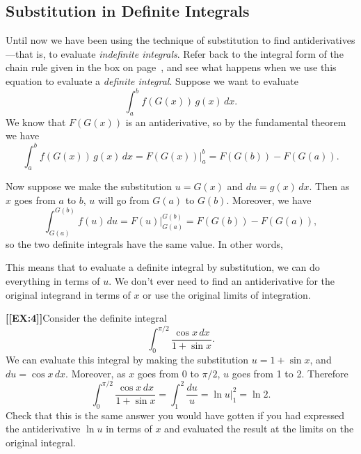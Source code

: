 \subsection{Substitution in Definite Integrals}
\label{subsec:substitution-in-definite-integrals}

Until now we have been using the technique of substitution to find
antiderivatives---that is, to evaluate {\em indefinite integrals}.
Refer back to the integral form of the chain rule given in the box on
page~\pageref{subrule}, and see what happens when we use this equation
to evaluate a {\em definite integral}.  Suppose we want to evaluate
\[
\int_a^bf(G(x))\,g(x)\,dx.
\] 
We know that $F(G(x))$ is an antiderivative, so by the fundamental
theorem we have
\[
\int_a^bf(G(x))\,g(x)\,dx=\left. F(G(x))\right|_a^b=F(G(b))-F(G(a)).
\]

Now suppose we make the substitution $u=G(x)$ and $du=g(x)\,dx$.  Then
as $x$ goes from $a$ to $b$, $u$ will go from $G(a)$ to $G(b)$.
Moreover, we have
\[
\int_{G(a)}^{G(b)} f(u)\,du=\left. F(u)\right|_{G(a)}^{G(b)} = F(G(b))-F(G(a)),
\]
so the two definite integrals have the same value. In other words,
\label{defint}
\begin{center}
\end{center}

This means that to evaluate a definite integral by substitution, we
can do everything in terms of $u$.  We don't ever need to find an
antiderivative for the original integrand in terms of $x$ or use the
original limits of integration.





{\bf [[EX:4]]}\quad Consider the definite integral
\[
\int_0^{\pi/2} \dfrac{\cos{x}\,dx}{1+\sin{x}}.
\]
We can evaluate this integral by making the substitution
$u=1+\sin{x}$, and $du=\cos{x}\,dx$.  Moreover, as $x$ goes from 0 to
$\pi/2$, $u$ goes from 1 to 2.  Therefore
\[
\int_0^{\pi/2} \dfrac{\cos{x}\,dx}{1+\sin{x}} 
   = \int_1^2 \dfrac{du}{u}=\left.\ln{u}\right|_1^2=\ln{2}.
\]
Check that this is the same answer you would have gotten if you had
expressed the antiderivative $\ln{u}$ in terms of $x$ and evaluated
the result at the limits on the original integral.






